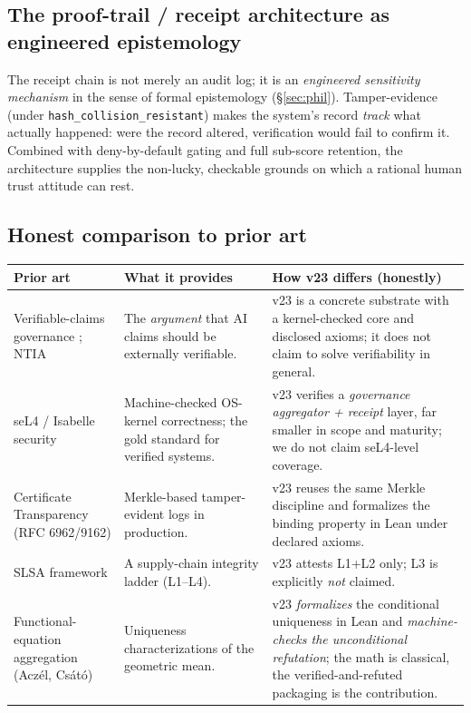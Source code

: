 \documentclass[11pt]{article}
\theoremstyle{plain}
\theoremstyle{definition}
\theoremstyle{remark}
\begin{document}
\subsection{The proof-trail / receipt architecture as engineered epistemology}
The receipt chain is not merely an audit log; it is an \emph{engineered sensitivity
mechanism} in the sense of formal epistemology (\S\ref{sec:phil}). Tamper-evidence
(under \texttt{hash\_collision\_resistant}) makes the system's record \emph{track}
what actually happened: were the record altered, verification would fail to confirm
it. Combined with deny-by-default gating and full sub-score retention, the
architecture supplies the non-lucky, checkable grounds on which a rational human
trust attitude can rest.

\subsection{Honest comparison to prior art}
\begin{longtable}{@{}p{}p{}p{}@{}}
\toprule
\textbf{Prior art} & \textbf{What it provides} & \textbf{How v23 differs (honestly)} \\
\midrule
\endhead
Verifiable-claims governance \cite{brundage2020}; NTIA \cite{ntia} & The \emph{argument} that AI claims should be externally verifiable. & v23 is a concrete substrate with a kernel-checked core and disclosed axioms; it does not claim to solve verifiability in general. \\
seL4 / Isabelle security & Machine-checked OS-kernel correctness; the gold standard for verified systems. & v23 verifies a \emph{governance aggregator + receipt} layer, far smaller in scope and maturity; we do not claim seL4-level coverage. \\
Certificate Transparency (RFC 6962/9162) & Merkle-based tamper-evident logs in production. & v23 reuses the same Merkle discipline and formalizes the binding property in Lean under declared axioms. \\
SLSA framework \cite{slsa} & A supply-chain integrity ladder (L1--L4). & v23 attests L1+L2 only; L3 is explicitly \emph{not} claimed. \\
Functional-equation aggregation (Acz\'el, Cs\'at\'o) & Uniqueness characterizations of the geometric mean. & v23 \emph{formalizes} the conditional uniqueness in Lean and \emph{machine-checks the unconditional refutation}; the math is classical, the verified-and-refuted packaging is the contribution. \\
\bottomrule
\end{longtable}
\end{document}
